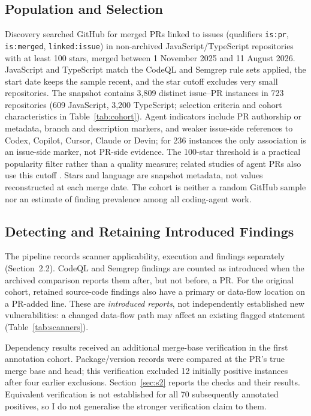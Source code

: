\documentclass[acmsmall,screen,nonacm]{acmart}
\begin{document}
\subsection{Population and Selection}

Discovery searched GitHub for merged PRs linked to issues (qualifiers \texttt{is:pr}, \texttt{is:merged}, \texttt{linked:issue}) in non-archived JavaScript/\allowbreak TypeScript repositories with at least 100 stars, merged between 1 November 2025 and 11 August 2026. JavaScript and TypeScript match the CodeQL and Semgrep rule sets applied, the start date keeps the sample recent, and the star cutoff excludes very small repositories. The snapshot contains 3,809 distinct issue--PR instances in 723 repositories (609 JavaScript, 3,200 TypeScript; selection criteria and cohort characteristics in Table~\ref{tab:cohort}). Agent indicators include PR authorship or metadata, branch and description markers, and weaker issue-side references to Codex, Copilot, Cursor, Claude or Devin; for 236 instances the only association is an issue-side marker, not PR-side evidence. The 100-star threshold is a practical popularity filter rather than a quality measure; related studies of agent PRs also use this cutoff \cite{b37,b38}. Stars and language are snapshot metadata, not values reconstructed at each merge date. The cohort is neither a random GitHub sample nor an estimate of finding prevalence among all coding-agent work.

\subsection{Detecting and Retaining Introduced Findings}

The pipeline records scanner applicability, execution and findings separately (Section~2.2). CodeQL and Semgrep findings are counted as introduced when the archived comparison reports them after, but not before, a PR. For the original cohort, retained source-code findings also have a primary or data-flow location on a PR-added line. These are \emph{introduced reports}, not independently established new vulnerabilities: a changed data-flow path may affect an existing flagged statement (Table~\ref{tab:scanners}).

Dependency results received an additional merge-base verification in the first annotation cohort. Package/version records were compared at the PR's true merge base and head; this verification excluded 12 initially positive instances after four earlier exclusions. Section~\ref{sec:s2} reports the checks and their results. Equivalent verification is not established for all 70 subsequently annotated positives, so I do not generalise the stronger verification claim to them.
\end{document}
